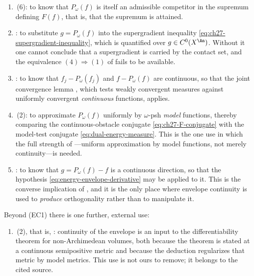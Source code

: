 \begin{enumerate}
\item[\textup{(EC2)}]
\,(6): to know that \(P_\omega(f)\) is itself
an admissible competitor in the supremum defining \(F(f)\), that is, that the
supremum is attained.
\item[\textup{(EC3)}]
: to substitute \(g=P_\omega(f)\)
into the supergradient inequality \eqref{eq:ch27-supergradient-inequality},
which is quantified over \(g\in C^0(X^{\An})\).  Without it one cannot
conclude that a supergradient is carried by the contact set, and the
equivalence \((4)\Rightarrow(1)\) of
 fails to be available.
\item[\textup{(EC4)}]
: to know that
\(f_j-P_\omega(f_j)\) and \(f-P_\omega(f)\) are continuous, so that the
joint convergence lemma , which tests weakly
convergent measures against uniformly convergent \emph{continuous}
functions, applies.
\item[\textup{(EC5)}]
\,(2): to approximate
\(P_\omega(f)\) uniformly by \(\omega\)-psh \emph{model} functions, thereby
comparing the continuous-obstacle conjugate \eqref{eq:ch27-F-conjugate}
with the model-test conjugate \eqref{eq:dual-energy-measure}.  This is the
one use in which the full strength of
---uniform approximation by model
functions, not merely continuity---is needed.
\item[\textup{(EC6)}]
: to know that
\(g=P_\omega(f)-f\) is a continuous direction, so that the hypothesis
\eqref{eq:energy-envelope-derivative} may be applied to it.  This is the
converse implication of
, and it is the only
place where envelope continuity is used to \emph{produce} orthogonality
rather than to manipulate it.
\end{enumerate}

Beyond \textup{(EC1)} there is one further, external use:

\begin{enumerate}
\item[\textup{(EC7)}]
\,(2), that is,
: continuity of the envelope is an
input to the differentiability theorem for non-Archimedean volumes, both
because the theorem is stated at a continuous semipositive metric and
because the deduction regularizes that metric by model metrics.  This use is
not ours to remove; it belongs to the cited source.
\end{enumerate}

